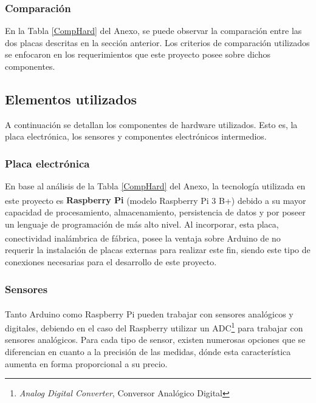             \subsubsection{Comparación}
                \par En la Tabla \ref{CompHard} del Anexo, se puede observar la comparación entre las dos placas descritas en la sección anterior. Los criterios de comparación utilizados se enfocaron en los requerimientos que este proyecto posee sobre dichos componentes.
        
    \subsection{Elementos utilizados}
    \label{subseccionElementosutilizados}
        \par A continuación se detallan los componentes de hardware utilizados. Esto es, la placa electrónica, los sensores y componentes electrónicos intermedios.
        
        \subsubsection{Placa electrónica}
            \par En base al análisis de la Tabla \ref{CompHard} del Anexo, la tecnología utilizada en este proyecto es \textbf{Raspberry\textsuperscript{\textregistered} Pi} (modelo Raspberry\textsuperscript{\textregistered} Pi 3 B+) debido a su mayor capacidad de procesamiento, almacenamiento, persistencia de datos y por poseer un lenguaje de programación de más alto nivel. Al incorporar, esta placa, conectividad inalámbrica de fábrica, posee la ventaja sobre Arduino\textsuperscript{\textregistered} de no requerir la instalación de placas externas para realizar este fin, siendo este tipo de conexiones necesarias para el desarrollo de este proyecto. 

        \subsubsection{Sensores}
            \par Tanto Arduino\textsuperscript{\textregistered} como Raspberry\textsuperscript{\textregistered} Pi pueden trabajar con sensores analógicos y digitales, debiendo en el caso del Raspberry\textsuperscript{\textregistered} utilizar un ADC\footnote{\textit{Analog Digital Converter}, Conversor Analógico Digital} para trabajar con sensores analógicos. Para cada tipo de sensor, existen numerosas opciones que se diferencian en cuanto a la precisión de las medidas, dónde esta característica aumenta en forma proporcional a su precio. 
            
